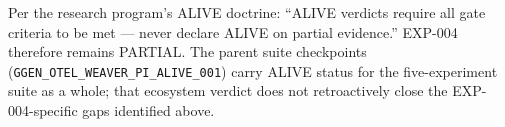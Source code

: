 Per the research program's ALIVE doctrine: ``ALIVE verdicts require all gate criteria to
be met --- never declare ALIVE on partial evidence.'' EXP-004 therefore remains PARTIAL.
The parent suite checkpoints (\texttt{GGEN\_OTEL\_WEAVER\_PI\_ALIVE\_001}) carry ALIVE
status for the five-experiment suite as a whole; that ecosystem verdict does not
retroactively close the EXP-004-specific gaps identified above.
